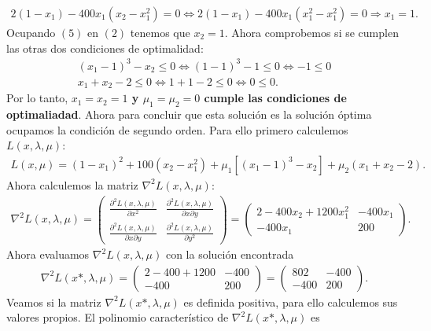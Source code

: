 \documentclass[11pt,letterpaper]{article}
\begin{document}
\begin{enumerate}
\begin{itemize}
\begin{align}
2(1-x_1)-400x_1(x_2-x_1^2)=0 \Leftrightarrow 2(1-x_1)-400x_1(x_1^2-x_1^2)=0 \Rightarrow x_1=1.
\end{align}
Ocupando $(5)$ en $(2)$ tenemos que $x_2=1$. Ahora comprobemos si se cumplen las otras dos condiciones de optimalidad:
\begin{align*}
(x_1-1)^3-x_2\leq 0\Leftrightarrow (1-1)^3-1\leq 0 \Leftrightarrow -1\leq 0\\
x_1+x_2-2\leq 0 \Leftrightarrow 1+1-2\leq 0 \Leftrightarrow 0\leq 0.
\end{align*}
Por lo tanto, \textbf{$x_1=x_2=1$ y $\mu_1=\mu_2=0$ cumple las condiciones de optimaliadad}. Ahora para concluir que esta solución es la solución óptima ocupamos la condición de segundo orden. Para ello primero calculemos $L(x,\lambda, \mu)$:
\begin{align}
L(x, \mu) = (1-x_1)^2+100(x_2-x_1^2)+\mu_1\left[(x_1-1)^3-x_2\right]+\mu_2(x_1+x_2-2).
\end{align}
Ahora calculemos la matriz $\nabla^2 L(x,\lambda, \mu)$:
\begin{align*}
\nabla^2 L(x,\lambda, \mu)=\begin{pmatrix}
\frac{\partial^2 L(x,\lambda, \mu)}{\partial x^2} & \frac{\partial^2 L(x,\lambda, \mu)}{\partial x\partial y}\\
\frac{\partial^2 L(x,\lambda, \mu)}{\partial x\partial y}& \frac{\partial^2 L(x,\lambda, \mu)}{\partial y^2}  
\end{pmatrix}= \begin{pmatrix}
2-400x_2+1200x_1^2 & -400x_1\\
-400x_1 & 200
\end{pmatrix}.
\end{align*}
Ahora evaluamos $\nabla^2 L(x,\lambda, \mu)$ con la solución encontrada
\begin{align*}
\nabla^2 L(x*,\lambda, \mu)=\begin{pmatrix}
2-400+1200 & -400\\
-400 & 200
\end{pmatrix}= \begin{pmatrix}
802 & -400\\
-400 & 200
\end{pmatrix}.
\end{align*}
Veamos si la matriz $\nabla^2 L(x*,\lambda, \mu)$ es definida positiva, para ello calculemos sus valores propios. El polinomio característico de $\nabla^2 L(x*,\lambda, \mu)$ es 
\begin{align*}

\end{align*}
\end{itemize}
\end{enumerate}
\end{document}
